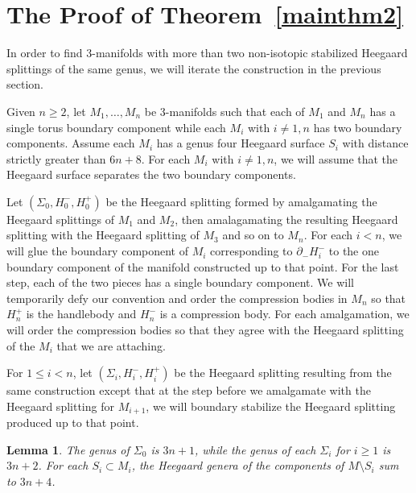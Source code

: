 \documentclass[12pt]{amsart}
\theoremstyle{plain}
\newtheorem{Lem}[Thm]{Lemma}
\theoremstyle{definition}
\begin{document}
\section{The Proof of Theorem~\ref{mainthm2}}
\label{thm2proofsect}
In order to find 3-manifolds with more than two non-isotopic stabilized Heegaard splittings of the same genus, we will iterate the construction in the previous section.

Given $n \geq 2$, let $M_1,\dots,M_n$ be 3-manifolds such that each of $M_1$ and $M_n$ has a single torus boundary component while each $M_i$ with $i \neq 1,n$ has two boundary components.  Assume each $M_i$ has a genus four Heegaard surface $S_i$ with distance strictly greater than $6n+8$.  For each $M_i$ with $i \neq 1,n$, we will assume that the Heegaard surface separates the two boundary components.  

Let $(\Sigma_0, H_0^-, H_0^+)$ be the Heegaard splitting formed by amalgamating the Heegaard splittings of $M_1$ and $M_2$, then amalagamating the resulting Heegaard splitting with the Heegaard splitting of $M_3$ and so on to $M_n$.  For each $i < n$, we will glue the boundary component of $M_i$ corresponding to $\partial_- H_i^-$ to the one boundary component of the manifold constructed up to that point.  For the last step, each of the two pieces has a single boundary component.  We will temporarily defy our convention and order the compression bodies in $M_n$ so that $H_n^+$ is the handlebody and $H_n^-$ is a compression body.  For each amalgamation, we will order the compression bodies so that they agree with the Heegaard splitting of the $M_i$ that we are attaching.

For $1 \leq i < n$, let $(\Sigma_i, H_i^-, H_i^+)$ be the Heegaard splitting resulting from the same construction except that at the step before we amalgamate with the Heegaard splitting for $M_{i+1}$, we will boundary stabilize the Heegaard splitting produced up to that point.

\begin{Lem}
\label{ex2boundlem}
The genus of $\Sigma_0$ is $3n + 1$, while the genus of each $\Sigma_i$ for $i \geq 1$ is $3n+2$.  For each $S_i \subset M_i$, the Heegaard genera of the components of $M \setminus S_i$ sum to $3n+4$.
\end{Lem}
\end{document}
